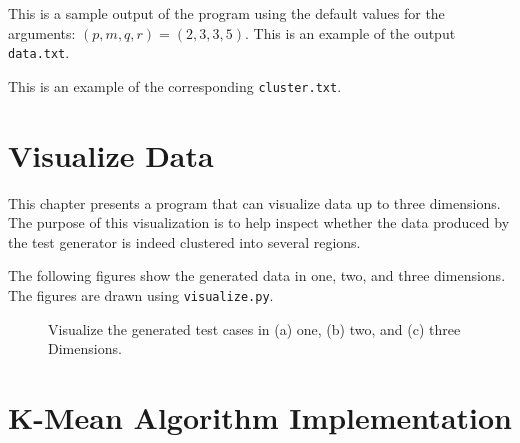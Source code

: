 This is a sample output of the program using the default values for
the arguments: $(p, m, q, r) = (2, 3, 3, 5)$.
This is an example of the output {\tt data.txt}.

\resetlinenumber[1]
\linenumbers
\begin{tt}
  
\end{tt}
\nolinenumbers

This is an example of the corresponding {\tt cluster.txt}.

\resetlinenumber[1]
\linenumbers
\begin{tt}
  
\end{tt}
\nolinenumbers

\section{Visualize Data}


This chapter presents a program that can visualize data up to three
dimensions.  The purpose of this visualization is to help inspect
whether the data produced by the test generator is indeed clustered
into several regions.

\resetlinenumber[1]
\linenumbers
\begin{tt}
  
\end{tt}
\nolinenumbers


The following figures show the generated data in one, two, and three
dimensions.  The figures are drawn using {\tt visualize.py}.


\clearpage

\begin{figure}[h] \centering
\caption{Visualize the generated test cases in (a) one, (b) two, and
  (c) three Dimensions. }
\label{fig:kmean:visualize}
\end{figure}

\clearpage

\section{K-Mean Algorithm Implementation}

